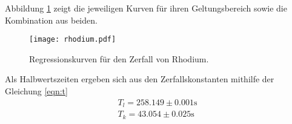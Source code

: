 Abbildung \ref{fig:regress} zeigt die jeweiligen Kurven für ihren Geltungsbereich sowie die Kombination aus beiden.

\begin{figure}
 \centering
 \texttt{[image: rhodium.pdf]}
 \caption{Regressionskurven für den Zerfall von Rhodium.}
 \label{fig:regress}
\end{figure}

\noindent Als Halbwertszeiten ergeben sich aus den Zerfallskonstanten mithilfe der Gleichung \eqref{eqn:t}
\begin{align*}
    T_l = 258.149 \pm 0.001 \si{\s} \\
    T_k = 43.054 \pm 0.025 \si{\s}\\
\end{align*}